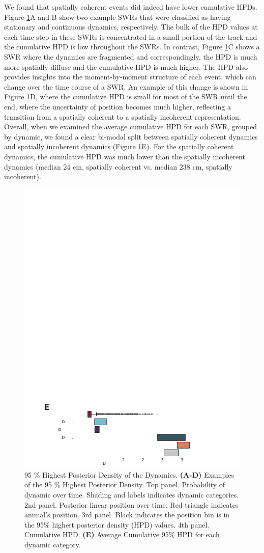 \documentclass[times, twoside]{zHenriquesLab-StyleBioRxiv}
\begin{document}
We found that spatially coherent events did indeed have lower cumulative HPDs. Figure \ref{4}A and B show two example SWRs that were classified as having stationary and continuous dynamics, respectively. The bulk of the HPD values at each time step in these SWRs is concentrated in a small portion of the track and the cumulative HPD is low throughout the SWRs. In contrast, Figure \ref{4}C shows a SWR where the dynamics are fragmented and correspondingly, the HPD is much more spatially diffuse and the cumulative HPD is much higher. The HPD also provides insights into the moment-by-moment structure of each event, which can change over the time course of a SWR. An example of this change is shown in Figure \ref{4}D, where the cumulative HPD is small for most of the SWR until the end, where the uncertainty of position becomes much higher, reflecting a transition from a spatially coherent to a spatially incoherent representation. Overall, when we examined the average cumulative HPD for each SWR, grouped by dynamic, we found a clear bi-modal split between spatially coherent dynamics and spatially incoherent dynamics (Figure \ref{4}E). For the spatially coherent dynamics, the cumulative HPD was much lower than the spatially incoherent dynamics (median 24 cm, spatially coherent vs. median 238 cm, spatially incoherent).

\begin{figure}%
\centering
\includegraphics[width=0.80\linewidth]{figures/Figure4/Figure4_v5}
\caption{95 \% Highest Posterior Density of the Dynamics. \textbf{(A-D)}  Examples of the 95 \% Highest Posterior Density. Top panel. Probability of dynamic over time. Shading and labels indicates dynamic categories. 2nd panel. Posterior linear position over time. Red triangle indicates animal's position. 3rd panel. Black indicates the position bin is in the 95\% highest posterior density (HPD) values. 4th panel. Cumulative HPD. \textbf{(E)} Average Cumulative 95\% HPD for each dynamic category.}
\label{4}
\end{figure}
\end{document}
